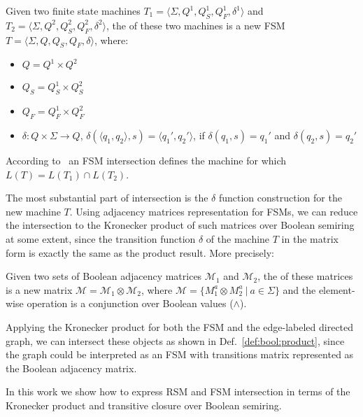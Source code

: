 \begin{definition}
\label{def:fsm:intersection}
Given two finite state machines $T_1 = \langle \Sigma, Q^1, Q_S^1, Q_F^1, \delta^1 \rangle$ and $T_2 = \langle \Sigma, Q^2, Q_S^2, Q_F^2, \delta^2 \rangle$, the  of these two machines is a new FSM $T = \langle \Sigma, Q, Q_S, Q_F, \delta \rangle$, where:
\begin{itemize}
    \item $Q = Q^1 \times Q^2$
    \item $Q_S = Q_S^1 \times Q_S^2$
    \item $Q_F = Q_F^1 \times Q_F^2$
    \item $\delta: Q \times \Sigma \to Q$,
    $\delta (\langle q_1, q_2 \rangle, s) = \langle q_1', q_2' \rangle$, if $\delta(q_1,s)=q_1'$ and $\delta(q_2,s)=q_2'$
\end{itemize}
\end{definition}

According to~\cite{automata:theory:10.5555/1177300} an FSM intersection defines the machine for which $L(T) = L(T_1) \cap L(T_2)$.

The most substantial part of intersection is the $\delta$ function construction for the new machine $T$.
Using adjacency matrices representation for FSMs, we can reduce the intersection to the Kronecker product of such matrices over Boolean semiring at some extent, since the transition function $\delta$ of the machine $T$ in the matrix form is exactly the same as the product result.
More precisely:

\begin{definition}
\label{def:bool:product}
Given two sets of Boolean adjacency matrices $\mathcal{M}_1$ and $\mathcal{M}_2$, the  of these matrices is a new matrix
$\mathcal{M} = \mathcal{M}_1 \otimes \mathcal{M}_2$, where $\mathcal{M} = \{ M_1^a \otimes M_2^a~|~a \in \Sigma \}$ and the element-wise operation is a conjunction over Boolean values ($\wedge$).
\end{definition}

Applying the Kronecker product for both the FSM and the edge-labeled directed graph, we can intersect these objects as shown in Def.~\ref{def:bool:product}, since the graph could be interpreted as an FSM with transitions matrix represented as the Boolean adjacency matrix.

In this work we show how to express RSM and FSM intersection in terms of
the Kronecker product and transitive closure over Boolean semiring.
